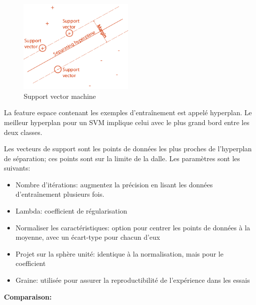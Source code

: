 \documentclass[12pt]{article}
\begin{document}
{%
\begin{figure}[H]
	\centering
    \includegraphics[width=0.5\textwidth]{image17.png}
     \caption{ Support vector machine }
    \label{fig:17}
\end{figure}


La feature espace contenant les exemples d'entraînement est appelé hyperplan. Le meilleur hyperplan pour un SVM implique celui avec le plus grand bord entre les deux classes.

Les vecteurs de support sont les points de données les plus proches de l'hyperplan de séparation; ces points sont sur la limite de la dalle.
Les paramètres sont les suivants:

\begin{itemize}
\item Nombre d'itérations: augmentez la précision en lisant les données d'entraînement plusieurs fois.
\item Lambda: coefficient de régularisation
\item Normaliser les caractéristiques: option pour centrer les points de données à la moyenne, avec un écart-type pour chacun d'eux
\item Projet sur la sphère unité: identique à la normalisation, mais pour le coefficient
\item Graine: utilisée pour assurer la reproductibilité de l'expérience dans les essais
\end{itemize}
\newpage
\textbf{Comparaison:}

\begin{center}
\begin{tabular}{|p{3cm}|p{2cm}|p{2cm}|p{2cm}|p{2cm}|p{3cm}|}
\hline
  

\end{tabular}
\end{center}}
\end{document}
